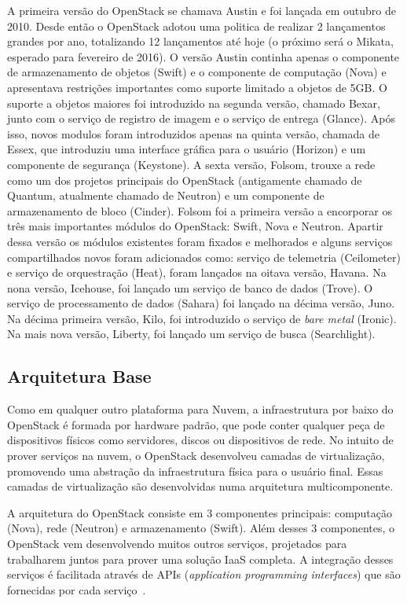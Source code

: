 A primeira versão do OpenStack se chamava Austin e foi lançada em outubro de 2010. Desde então o OpenStack adotou uma politica de realizar 2 lançamentos grandes por ano, totalizando 12 lançamentos até hoje (o próximo será o Mikata, esperado para fevereiro de 2016). O versão Austin continha apenas o componente de armazenamento de objetos (Swift) e o componente de computação (Nova) e apresentava restrições importantes como suporte limitado a objetos de 5GB. O suporte a objetos maiores foi introduzido na segunda versão, chamado Bexar, junto com o serviço de registro de imagem e o serviço de entrega (Glance). Após isso, novos modulos foram introduzidos apenas na quinta versão, chamada de Essex, que introduziu uma interface gráfica para o usuário (Horizon) e um componente de segurança (Keystone). A sexta versão, Folsom, trouxe a rede como um dos projetos principais do OpenStack (antigamente chamado de Quantum, atualmente chamado de Neutron) e um componente de armazenamento de bloco (Cinder). Folsom foi a primeira versão a encorporar os três mais importantes módulos do OpenStack: Swift, Nova e Neutron. Apartir dessa versão os módulos existentes foram fixados e melhorados e alguns serviços compartilhados novos foram adicionados como: serviço de telemetria (Ceilometer) e serviço de orquestração (Heat), foram lançados na oitava versão, Havana. Na nona versão, Icehouse, foi lançado um serviço de banco de dados (Trove). O serviço de processamento de dados (Sahara) foi lançado na décima versão, Juno. Na décima primeira versão, Kilo, foi introduzido o serviço de \textit{bare metal} (Ironic). Na mais nova versão, Liberty, foi lançado um serviço de busca (Searchlight).

\subsection{Arquitetura Base}

Como em qualquer outro plataforma para Nuvem, a infraestrutura por baixo do OpenStack é formada por hardware padrão, que pode conter qualquer peça de dispositivos físicos como servidores, discos ou dispositivos de rede. No intuito de prover serviços na nuvem, o OpenStack desenvolveu camadas de virtualização, promovendo uma abstração da infraestrutura física para o usuário final. Essas camadas de virtualização são desenvolvidas numa arquitetura multicomponente.

A arquitetura do OpenStack consiste em 3 componentes principais: computação (Nova), rede (Neutron) e armazenamento (Swift). Além desses 3 componentes, o OpenStack vem desenvolvendo muitos outros serviços, projetados para trabalharem juntos para prover uma solução IaaS completa. A integração desses serviços é facilitada através de APIs (\textit{application programming interfaces}) que são fornecidas por cada serviço~\cite{OpenStack:Online}.


